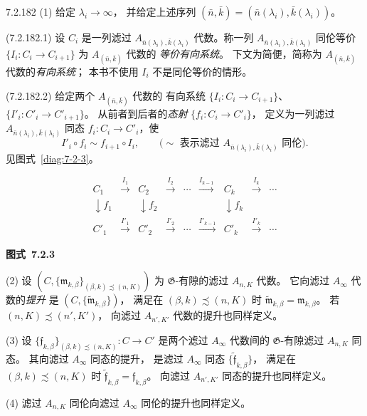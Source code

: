 \begin{definition}{7.2.182}\label{def:7-2-182}
\noindent\textup{(1)} 给定 $\lambda_i\to\infty$，
并给定上述序列
$(\bar n,\bar k)=
(\bar n(\lambda_i),\bar k(\lambda_i))$。

\noindent\textup{(7.2.182.1)}
设 $C_i$ 是一列滤过
$A_{\bar n(\lambda_i),\bar k(\lambda_i)}$
代数。称一列
$A_{\bar n(\lambda_i),\bar k(\lambda_i)}$
同伦等价
$\{I_i\colon C_i\to C_{i+1}\}$
为 $A_{(\bar n,\bar k)}$ 代数的
\emph{等价有向系统}。
下文为简便，简称为
$A_{(\bar n,\bar k)}$ 代数的\emph{有向系统}；
本书不使用 $I_i$ 不是同伦等价的情形。

\noindent\textup{(7.2.182.2)}
给定两个 $A_{(\bar n,\bar k)}$ 代数的
有向系统 $\{I_i\colon C_i\to C_{i+1}\}$、
$\{I'_i\colon C'_i\to C'_{i+1}\}$。
从前者到后者的\emph{态射}
$\{f_i\colon C_i\to C'_i\}$，
定义为一列滤过
$A_{\bar n(\lambda_i),\bar k(\lambda_i)}$
同态 $f_i\colon C_i\to C'_i$，使
\begin{equation}
I'_i\circ f_i\sim f_{i+1}\circ I_i,
\qquad
\bigl(\sim\text{ 表示滤过 }
A_{\bar n(\lambda_i),\bar k(\lambda_i)}
\text{ 同伦}\bigr).
\tag{7.2.183}\label{eq:7-2-183}
\end{equation}
见图式~\ref{diag:7-2-3}。

\par\medskip\noindent\begin{minipage}{\textwidth}
\centering
\[
\begin{array}{ccccccccc}
C_1&\xrightarrow{I_1}&C_2&\xrightarrow{I_2}&\cdots
&\xrightarrow{I_{k-1}}&C_k&\xrightarrow{I_k}&\cdots\\[1ex]
\downarrow f_1&&\downarrow f_2&&&&\downarrow f_k&&\\[-0.3ex]
C'_1&\xrightarrow{I'_1}&C'_2&\xrightarrow{I'_2}&\cdots
&\xrightarrow{I'_{k-1}}&C'_k&\xrightarrow{I'_k}&\cdots
\end{array}
\]
\par{\renewcommand{\thefigure}{7.2.3}
\normalfont\bfseries 图式~\thefigure\label{diag:7-2-3}}
\end{minipage}\par\medskip

\noindent\textup{(2)}
设 $(C,\{\mathfrak m_{k,\beta}\}_
{(\beta,k)\precsim(n,K)})$
为 $\mathfrak G$-有隙的滤过 $A_{n,K}$ 代数。
它向滤过 $A_\infty$ 代数的\emph{提升}
是 $(C,\{\widetilde{\mathfrak m}_{k,\beta}\})$，
满足在 $(\beta,k)\precsim(n,K)$ 时
$\widetilde{\mathfrak m}_{k,\beta}
=\mathfrak m_{k,\beta}$。
若 $(n,K)\precsim(n',K')$，
向滤过 $A_{n',K'}$ 代数的提升也同样定义。

\noindent\textup{(3)}
设 $\{\mathfrak f_{k,\beta}\}_
{(\beta,k)\precsim(n,K)}\colon C\to C'$
是两个滤过 $A_\infty$ 代数间的
$\mathfrak G$-有隙滤过 $A_{n,K}$ 同态。
其向滤过 $A_\infty$ 同态的提升，
是滤过 $A_\infty$ 同态
$\{\widetilde{\mathfrak f}_{k,\beta}\}$，
满足在 $(\beta,k)\precsim(n,K)$ 时
$\widetilde{\mathfrak f}_{k,\beta}
=\mathfrak f_{k,\beta}$。
向滤过 $A_{n',K'}$ 同态的提升也同样定义。

\noindent\textup{(4)}
滤过 $A_{n,K}$ 同伦向滤过
$A_\infty$ 同伦的提升也同样定义。
\end{definition}

